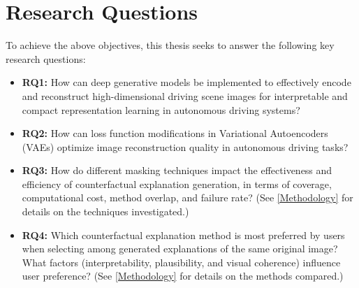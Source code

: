 \section{Research Questions} \label{sec:research_question}
To achieve the above objectives, this thesis seeks to answer the following key research questions:

\begin{itemize}
    \item \textbf{RQ1:} How can deep generative models be implemented to effectively encode and reconstruct high-dimensional driving scene images for interpretable and compact representation learning in autonomous driving systems?

    \item \textbf{RQ2:} How can loss function modifications in Variational Autoencoders (VAEs) optimize image reconstruction quality in autonomous driving tasks? 
    
    \item \textbf{RQ3:} How do different masking techniques impact the effectiveness and efficiency of counterfactual explanation generation, in terms of coverage, computational cost, method overlap, and failure rate?  (See \cref{Methodology} for details on the techniques investigated.) 

    \item \textbf{RQ4:} Which counterfactual explanation method is most preferred by users when selecting among generated explanations of the same original image? What factors (interpretability, plausibility, and visual coherence) influence user preference? (See \cref{Methodology} for details on the methods compared.)
\end{itemize}

